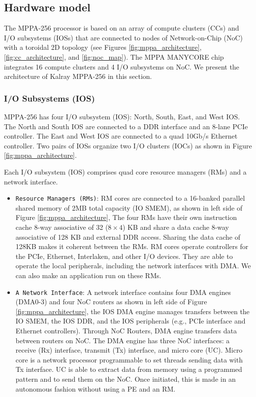 \documentclass{sig-alternate-05-2015}
\begin{document}
\subsection{Hardware model}
\label{sec:hardware_model}
The MPPA-256 processor is based on an array of compute clusters (CCs) and I/O subsystems (IOSs) that are connected to nodes of Network-on-Chip (NoC) with a toroidal 2D topology 
(see Figures \ref{fig:mppa_architecture}, \ref{fig:cc_architecture}, and \ref{fig:noc_map}).
The MPPA MANYCORE chip integrates 16 compute clusters and 4 I/O subsystems on NoC.
We present the architecture of Kalray MPPA-256 in this section.

\subsubsection{I/O Subsystems (IOS)}
\label{sec:ios}
MPPA-256 has four I/O subsystem (IOS): North, South, East, and West IOS.
The North and South IOS are connected to a DDR interface and an 8-lane PCIe controller.
The East and West IOS are connected to a quad 10Gb/s Ethernet controller.
Two pairs of IOSs organize two I/O clusters (IOCs) as shown in Figure \ref{fig:mppa_architecture}.

Each I/O subsystem (IOS) comprises quad core resource managers (RMs) and a network interface.
\begin{itemize}
\item \verb+Resource Managers (RMs)+: RM cores are connected to a 16-banked parallel shared memory of 2MB total capacity (IO SMEM), as shown in left side of Figure \ref{fig:mppa_architecture},
The four RMs have their own instruction cache 8-way associative of 32 ($8 \times 4$) KB and share a data cache 8-way associative of 128 KB and external DDR access.
Sharing the data cache of 128KB makes it coherent between the RMs.
RM cores operate controllers for the PCIe, Ethernet, Interlaken, and other I/O devices.
They are able to operate the local peripherals, including the network interfaces with DMA.
We can also make an application run on these RMs.
\item \verb+A Network Interface+: A network interface contains four DMA engines (DMA0-3) and four NoC routers as shown in left side of Figure \ref{fig:mppa_architecture},
the IOS DMA engine manages transfers between the IO SMEM, the IOS DDR, and the IOS peripherals (e.g., PCIe interface and Ethernet controllers).
Through NoC Routers, DMA engine transfers data between routers on NoC.
The DMA engine has three NoC interfaces: a receive (Rx) interface, transmit (Tx) interface, and micro core (UC).
Micro core is a network processor programmable to set threads sending data with Tx interface.
UC is able to extract data from memory using a programmed pattern and to send them on the NoC.
Once initiated, this is made in an autonomous fashion without using a PE and an RM.
\end{itemize}
\end{document}
